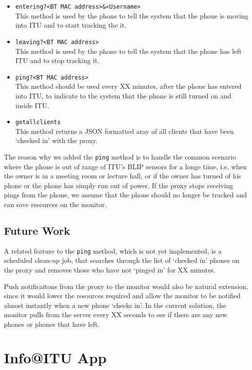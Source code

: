 \documentclass{ubicomp2011}
\begin{document}
\begin{itemize}
\item \texttt{entering?<BT MAC address>\&<Username>}\\
This method is used by the phone to tell the system that the phone is moving into ITU and to start tracking the it.
\item \texttt{leaving?<BT MAC address>}\\
This method is used by the phone to tell the system that the phone has left ITU and to stop tracking it.
\item \texttt{ping?<BT MAC address>}\\
This method should be used every XX minutes, after the phone has entered into ITU, to indicate to the system that the phone is still turned on and inside ITU.
\item \texttt{getallclients}\\
This method returns a JSON formatted aray of all clients that have been `checked in’ with the proxy.
\end{itemize}

The reason why we added the \texttt{ping} method is to handle the common scenario where the phone is out of range of ITU's BLIP sensors for a longe time, i.e. when the owner is in a meeting room or lecture hall, or if the owner has turned of his phone or the phone has simply run out of power. If the proxy stops receiving pings from the phone, we assume that the phone should no longer be tracked and can save resources on the monitor.
\subsection{Future Work}

A related feature to the \texttt{ping} method, which is not yet implemented, is a scheduled clean-up job, that searches through the list of `checked in' phones on the proxy and removes those who have not `pinged in' for XX minutes.

Push notificaitons from the proxy to the monitor would also be natural extension, since it would lower the resources required and allow the monitor to be notified almost instantly when a new phone `checks in'. In the current solution, the monitor pulls from the server every XX seconds to see if there are any new phones or phones that have left.

\section{Info@ITU App}
\end{document}
